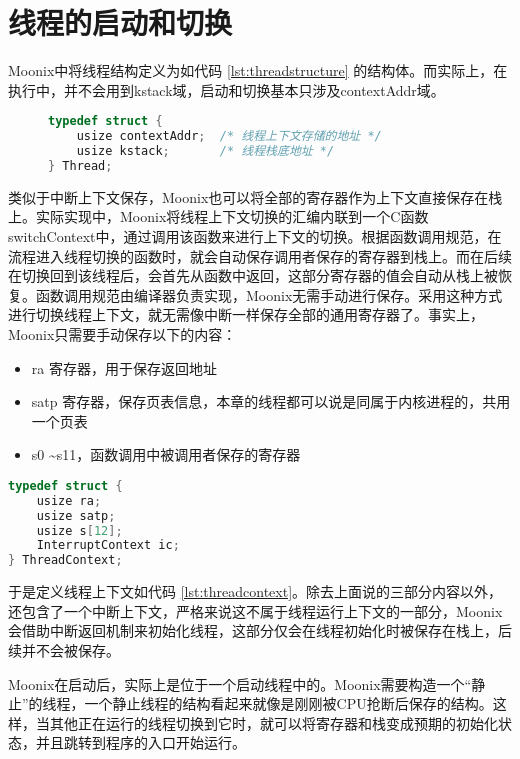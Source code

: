 \section{线程的启动和切换}

Moonix中将线程结构定义为如代码 \ref{lst:threadstructure} 的结构体。而实际上，在执行中，并不会用到kstack域，启动和切换基本只涉及contextAddr域。

\begin{figure}
\begin{lstlisting}[language={C}, caption={线程结构定义}, label={lst:threadstructure}]
typedef struct {
	usize contextAddr;  /* 线程上下文存储的地址 */
	usize kstack;       /* 线程栈底地址 */
} Thread;
\end{lstlisting}
\end{figure}

类似于中断上下文保存，Moonix也可以将全部的寄存器作为上下文直接保存在栈上。实际实现中，Moonix将线程上下文切换的汇编内联到一个C函数switchContext中，通过调用该函数来进行上下文的切换。根据函数调用规范，在流程进入线程切换的函数时，就会自动保存调用者保存的寄存器到栈上。而在后续在切换回到该线程后，会首先从函数中返回，这部分寄存器的值会自动从栈上被恢复。函数调用规范由编译器负责实现，Moonix无需手动进行保存。采用这种方式进行切换线程上下文，就无需像中断一样保存全部的通用寄存器了。事实上，Moonix只需要手动保存以下的内容：

\begin{itemize}
	\item ra 寄存器，用于保存返回地址
	\item satp 寄存器，保存页表信息，本章的线程都可以说是同属于内核进程的，共用一个页表
	\item s0 \textasciitilde s11，函数调用中被调用者保存的寄存器
\end{itemize}

\begin{lstlisting}[language={C}, caption={线程上下文定义}, label={lst:threadcontext}]
typedef struct {
	usize ra;
	usize satp;
	usize s[12];
	InterruptContext ic;
} ThreadContext;
\end{lstlisting}

于是定义线程上下文如代码 \ref{lst:threadcontext}。除去上面说的三部分内容以外，还包含了一个中断上下文，严格来说这不属于线程运行上下文的一部分，Moonix会借助中断返回机制来初始化线程，这部分仅会在线程初始化时被保存在栈上，后续并不会被保存。

Moonix在启动后，实际上是位于一个启动线程中的。Moonix需要构造一个“静止”的线程，一个静止线程的结构看起来就像是刚刚被CPU抢断后保存的结构。这样，当其他正在运行的线程切换到它时，就可以将寄存器和栈变成预期的初始化状态，并且跳转到程序的入口开始运行。

